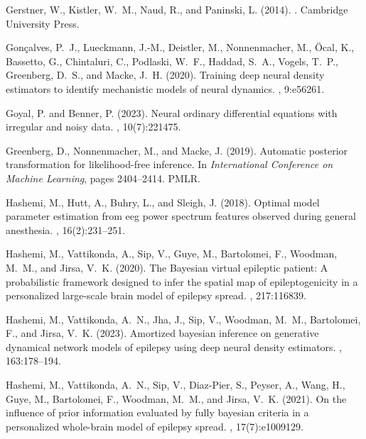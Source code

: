\documentclass[12pt]{article}
\begin{document}
\begin{thebibliography}{}
Gerstner, W., Kistler, W.~M., Naud, R., and Paninski, L. (2014).
.
\newblock Cambridge University Press.

Gon{\c{c}}alves, P.~J., Lueckmann, J.-M., Deistler, M., Nonnenmacher, M.,
  \"Ocal, K., Bassetto, G., Chintaluri, C., Podlaski, W.~F., Haddad, S.~A.,
  Vogels, T.~P., Greenberg, D.~S., and Macke, J.~H. (2020).
\newblock Training deep neural density estimators to identify mechanistic
  models of neural dynamics.
, 9:e56261.

Goyal, P. and Benner, P. (2023).
\newblock Neural ordinary differential equations with irregular and noisy data.
, 10(7):221475.

Greenberg, D., Nonnenmacher, M., and Macke, J. (2019).
\newblock Automatic posterior transformation for likelihood-free inference.
\newblock In {\em International Conference on Machine Learning}, pages
  2404--2414. PMLR.

Hashemi, M., Hutt, A., Buhry, L., and Sleigh, J. (2018).
\newblock Optimal model parameter estimation from eeg power spectrum features
  observed during general anesthesia.
, 16(2):231--251.

Hashemi, M., Vattikonda, A., Sip, V., Guye, M., Bartolomei, F., Woodman, M.~M.,
  and Jirsa, V.~K. (2020).
\newblock The {Bayesian} virtual epileptic patient: A probabilistic framework
  designed to infer the spatial map of epileptogenicity in a personalized
  large-scale brain model of epilepsy spread.
, 217:116839.

Hashemi, M., Vattikonda, A.~N., Jha, J., Sip, V., Woodman, M.~M., Bartolomei,
  F., and Jirsa, V.~K. (2023).
\newblock Amortized bayesian inference on generative dynamical network models
  of epilepsy using deep neural density estimators.
, 163:178--194.

Hashemi, M., Vattikonda, A.~N., Sip, V., Diaz-Pier, S., Peyser, A., Wang, H.,
  Guye, M., Bartolomei, F., Woodman, M.~M., and Jirsa, V.~K. (2021).
\newblock On the influence of prior information evaluated by fully bayesian
  criteria in a personalized whole-brain model of epilepsy spread.
, 17(7):e1009129.


\end{thebibliography}
\end{document}
